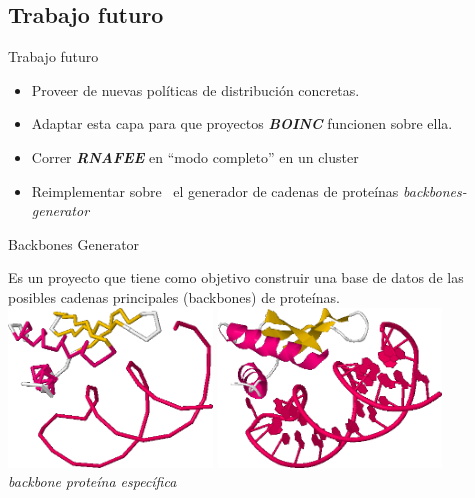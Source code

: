 \subsection{Trabajo futuro}

\begin{frame}{Trabajo futuro}

    \begin{itemize}
        \item Proveer de nuevas políticas de distribución concretas.
        \item Adaptar esta capa para que proyectos \textbf{\textit{BOINC}} funcionen sobre ella.
        \item Correr \textit{\textbf{RNAFEE}} en ``modo completo'' en un cluster
        \item Reimplementar sobre \rc\ el generador de cadenas de proteínas \textit{backbones-generator}
    \end{itemize}
\end{frame}


\begin{frame}{Backbones Generator}
    
    Es un proyecto que tiene como objetivo construir una base de datos de las posibles cadenas principales (backbones) de
    proteínas.\\[0.5cm]
    \includegraphics[height=120pt]{images/2L3C-backbone.png} \includegraphics[height=120pt]{images/2L3C-cartoon.png}\\[0.2cm]
    \qquad \qquad \qquad \textit{backbone} \qquad \qquad \qquad \qquad \qquad \textit{proteína específica}
\end{frame}

